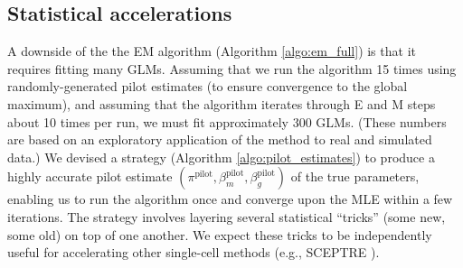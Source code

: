 \documentclass[12pt]{article}
\begin{document}
\subsection{Statistical accelerations}
A downside of the the EM algorithm (Algorithm \ref{algo:em_full}) is that it requires fitting many GLMs. Assuming that we run the algorithm 15 times using randomly-generated pilot estimates (to ensure convergence to the global maximum), and assuming that the algorithm iterates through E and M steps about 10 times per run, we must fit approximately 300 GLMs. (These numbers are based on an exploratory application of the method to real and simulated data.) We devised a strategy (Algorithm \ref{algo:pilot_estimates}) to produce a highly accurate pilot estimate $(\pi^\textrm{pilot}, \beta_m^\textrm{pilot}, \beta_g^\textrm{pilot})$ of the true parameters, enabling us to run the algorithm once and converge upon the MLE within a few iterations. The strategy involves layering several statistical ``tricks'' (some new, some old) on top of one another. We expect these tricks to be independently useful for accelerating other single-cell methods (e.g., SCEPTRE \cite{Barry2020}).
\end{document}
